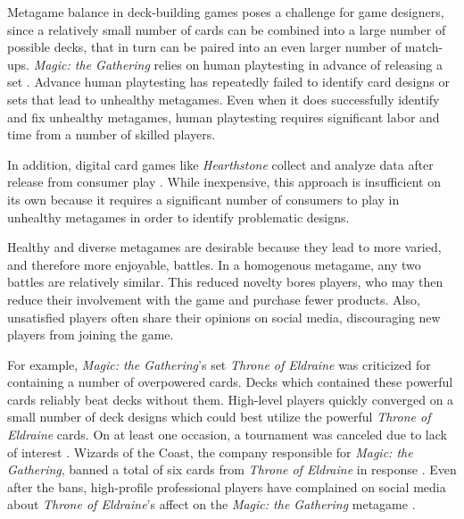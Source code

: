 Metagame balance in deck-building games poses a challenge for game
designers, since a relatively small number of cards can be combined
into a large number of possible decks, that in turn can be paired
into an even larger number of match-ups. \textit{Magic: the Gathering}
relies on human playtesting in advance of releasing a set
\cite{designing-hod-ffl}. Advance human playtesting has repeatedly
failed to identify card designs or sets that lead to unhealthy
metagames. Even when it does successfully identify and fix unhealthy
metagames, human playtesting requires significant labor and time from
a number of skilled players.

In addition, digital card games like \textit{Hearthstone} collect and
analyze data after release from consumer play
\cite{blizzard-gamebalancetalk-keg2019}. While inexpensive, this
approach is insufficient on its own because it requires a significant
number of consumers to play in unhealthy metagames in order to
identify problematic designs.


Healthy and diverse metagames are desirable because they lead to more
varied, and therefore more enjoyable, battles. In a homogenous
metagame, any two battles are relatively similar. This reduced novelty
bores players, who may then reduce their involvement with the game and
purchase fewer products. Also, unsatisfied players often share their
opinions on social media, discouraging new players from joining the
game.


For example, \textit{Magic: the Gathering}'s set \textit{Throne of
  Eldraine} was criticized for containing a number of overpowered
cards. Decks which contained these powerful cards reliably beat decks
without them. High-level players quickly converged on a small number
of deck designs which could best utilize the powerful \textit{Throne
  of Eldraine} cards. On at least one occasion, a tournament was
canceled due to lack of interest \cite{oko-meta-drama}. Wizards of the
Coast, the company responsible for \textit{Magic: the Gathering},
banned a total of six cards from \textit{Throne of Eldraine} in
response \cite{mtg-banlist, mtg-bnr-nov-2019, mtg-bnr-jun-2020,
  mtg-bnr-aug-2020}. Even after the bans, high-profile professional
players have complained on social media about \textit{Throne of
  Eldraine}'s affect on the \textit{Magic: the Gathering} metagame
\cite{lsv-eldraine-complaints}.

